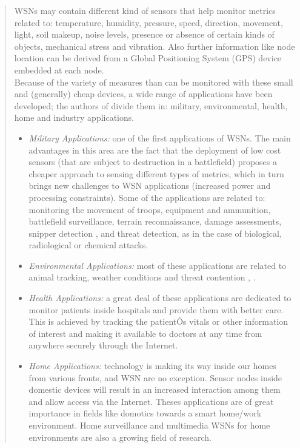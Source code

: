 \begin{quotation}
WSNs may contain different kind of sensors that help monitor metrics related to: temperature, humidity, pressure, speed, direction, movement, light, soil makeup, noise levels, presence or absence of certain kinds of objects, mechanical stress and vibration. Also further information like node location can be derived from a Global Positioning System (GPS) device embedded at each node.\\

Because of the variety of measures than can be monitored with these small and (generally) cheap devices, a wide range of applications have been developed; the authors of \cite{akyildiz2010wireless} divide them in: military, environmental, health, home and industry applications.\\

\begin{itemize}
    \item \emph{Military Applications:} one of the first applications of WSNs. The main advantages in this area are the fact that the deployment of low cost sensors (that are subject to destruction in a battlefield) proposes a cheaper approach to sensing different types of metrics, which in turn brings new challenges to WSN applications (increased power and processing constraints). Some of the applications are related to: monitoring the movement of troops, equipment and ammunition, battlefield surveillance, terrain reconnaissance, damage assessments, snipper detection \cite{ledeczi2005countersniper}, \cite{mazurek2005boomerang} and threat detection, as in the case of biological, radiological or chemical attacks.\\
    \item \emph{Environmental Applications:} most of these applications are related to animal tracking, weather conditions and threat contention \cite{polastre2004analysis}, \cite{szewczyk2004habitat}.\\
    \item \emph{Health Applications:} a great deal of these applications are dedicated to monitor patients inside hospitals and provide them with better care. This is achieved by tracking the patientÕs vitals or other information of interest and making it available to doctors at any time from anywhere securely through the Internet. \\
    \item \emph{Home Applications:} technology is making its way inside our homes from various fronts, and WSN are no exception. Sensor nodes inside domestic devices will result in an increased interaction among them and allow access via the Internet. Theses applications are of great importance in fields like domotics towards a smart home/work environment. Home surveillance and multimedia WSNs for home environments are also a growing field of research.\\

\end{itemize}
\end{quotation}
